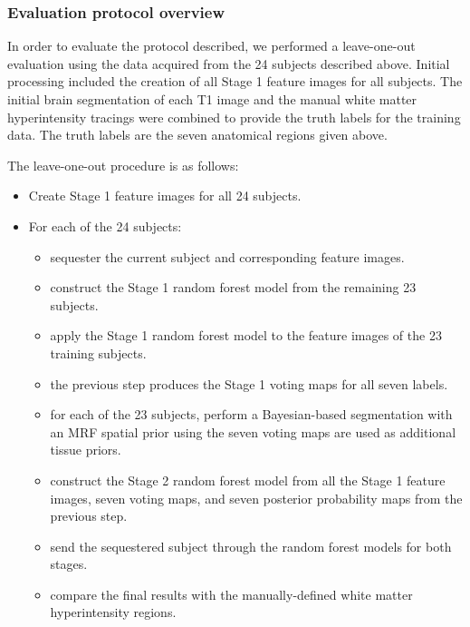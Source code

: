 \documentclass[11pt,]{article}
\providecommand{\tightlist}{%
  \setlength{\itemsep}{0pt}\setlength{\parskip}{0pt}}
\begin{document}
\subsubsection{Evaluation protocol
overview}\label{evaluation-protocol-overview}

In order to evaluate the protocol described, we performed a
leave-one-out evaluation using the data acquired from the 24 subjects
described above. Initial processing included the creation of all Stage 1
feature images for all subjects. The initial brain segmentation of each
T1 image and the manual white matter hyperintensity tracings were
combined to provide the truth labels for the training data. The truth
labels are the seven anatomical regions given above.

The leave-one-out procedure is as follows:

\begin{itemize}
\tightlist
\item
  Create Stage 1 feature images for all 24 subjects.
\item
  For each of the 24 subjects:

  \begin{itemize}
  \tightlist
  \item
    sequester the current subject and corresponding feature images.
  \item
    construct the Stage 1 random forest model from the remaining 23
    subjects.
  \item
    apply the Stage 1 random forest model to the feature images of the
    23 training subjects.
  \item
    the previous step produces the Stage 1 voting maps for all seven
    labels.
  \item
    for each of the 23 subjects, perform a Bayesian-based segmentation
    with an MRF spatial prior using the seven voting maps are used as
    additional tissue priors.
  \item
    construct the Stage 2 random forest model from all the Stage 1
    feature images, seven voting maps, and seven posterior probability
    maps from the previous step.
  \item
    send the sequestered subject through the random forest models for
    both stages.
  \item
    compare the final results with the manually-defined white matter
    hyperintensity regions.
  \end{itemize}
\end{itemize}
\end{document}
